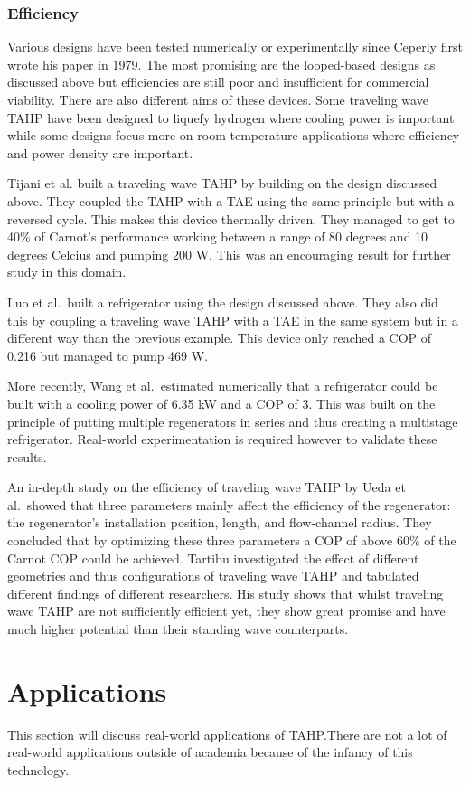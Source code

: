 \documentclass[a4paper]{article}
\newcommand{\newpara}
    {
      \bigbreak{}
      \noindent
    }
\begin{document}
\subsubsection{Efficiency}
Various designs have been tested numerically or experimentally since Ceperly first wrote his paper in 1979. The most promising are the looped-based designs as discussed above but efficiencies are still poor and insufficient for commercial viability. There are also different aims of these devices. Some traveling wave TAHP have been designed to liquefy hydrogen where cooling power is important while some designs focus more on room temperature applications where efficiency and power density are important\cite{WangRoomTemperature}.
\newpara{}
Tijani et al.\cite{spoelstraHighTemperature} built a traveling wave TAHP by building on the design discussed above. They coupled the TAHP with a TAE using the same principle but with a reversed cycle. This makes this device thermally driven. They managed to get to 40\% of Carnot's performance working between a range of 80 degrees and 10 degrees Celcius and pumping 200 W. This was an encouraging result for further study in this domain.
\newpara{}
Luo et al.\ built a refrigerator using the design discussed above\cite{LuoRefrigerator}. They also did this by coupling a traveling wave TAHP with a TAE in the same system but in a different way than the previous example. This device only reached a COP of 0.216 but managed to pump 469 W.
\newpara{}
More recently, Wang et al.\ estimated numerically that a refrigerator could be built with a cooling power of 6.35 kW and a COP of 3. This was built on the principle of putting multiple regenerators in series and thus creating a multistage refrigerator. Real-world experimentation is required however to validate these results.
\newpara{}
An in-depth study on the efficiency of traveling wave TAHP by Ueda et al.\ showed that three parameters mainly affect the efficiency of the regenerator: the regenerator's installation position, length, and flow-channel radius\cite{uedaOptimization}. They concluded that by optimizing these three parameters a COP of above 60\% of the Carnot COP could be achieved. Tartibu investigated the effect of different geometries and thus configurations of traveling wave TAHP and tabulated different findings of different researchers\cite{TARTIBU2019102}. His study shows that whilst traveling wave TAHP are not sufficiently efficient yet, they show great promise and have much higher potential than their standing wave counterparts.

\section{Applications}
This section will discuss real-world applications of TAHP.\@ There are not a lot of real-world applications outside of academia because of the infancy of this technology.
\end{document}
